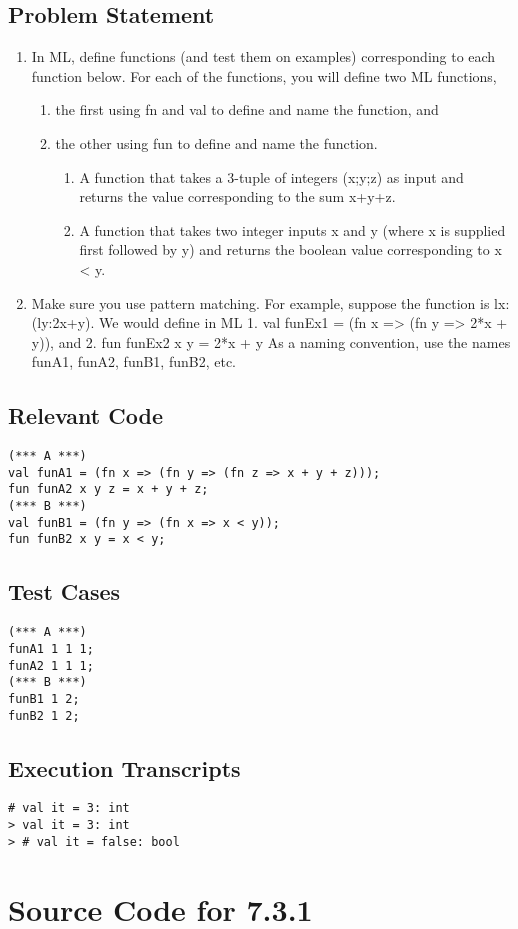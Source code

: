 \documentclass[twoside]{report}
\begin{document}
\section{Problem Statement}
\begin{enumerate}
    \item In ML, define functions (and test them on examples) corresponding to each function below. For each of the functions, you will define two ML functions,
    \begin{enumerate}
        \item the first using fn and val to define and name the function, and
        \item the other using fun to define and name the function.
        \begin{enumerate}
            \item A function that takes a 3-tuple of integers (x;y;z) as input and returns the value corresponding to the sum x+y+z.
            \item A function that takes two integer inputs x and y (where x is supplied first followed by y) and returns the boolean value corresponding to x < y.
        \end{enumerate}
    \end{enumerate}
    \item Make sure you use pattern matching. For example, suppose the function is lx:(ly:2x+y). We would define in ML 1. val funEx1 = (fn x => (fn y => 2*x + y)), and 2. fun funEx2 x y = 2*x + y As a naming convention, use the names funA1, funA2, funB1, funB2, etc.
\end{enumerate}
\section{Relevant Code}
    \begin{lstlisting}[frame=trBL]
(*** A ***)
val funA1 = (fn x => (fn y => (fn z => x + y + z)));
fun funA2 x y z = x + y + z;
(*** B ***)
val funB1 = (fn y => (fn x => x < y));
fun funB2 x y = x < y;
    \end{lstlisting}
\section{Test Cases}
    \begin{scriptsize}
    \begin{verbatim}
(*** A ***)
funA1 1 1 1;
funA2 1 1 1;
(*** B ***)
funB1 1 2;
funB2 1 2;
    \end{verbatim}
    \end{scriptsize}
\section{Execution Transcripts}
\begin{scriptsize}
    \begin{verbatim}
# val it = 3: int
> val it = 3: int
> # val it = false: bool
    \end{verbatim}
\end{scriptsize}

\appendix{}
\chapter{Source Code for 7.3.1}
\label{cha:apdx-a}
%
\end{document}
